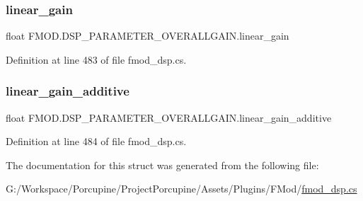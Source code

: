 \subsubsection{\texorpdfstring{linear\+\_\+gain}{linear\_gain}}
{\footnotesize\ttfamily float F\+M\+O\+D.\+D\+S\+P\+\_\+\+P\+A\+R\+A\+M\+E\+T\+E\+R\+\_\+\+O\+V\+E\+R\+A\+L\+L\+G\+A\+I\+N.\+linear\+\_\+gain}



Definition at line 483 of file fmod\+\_\+dsp.\+cs.

\mbox{\label{struct_f_m_o_d_1_1_d_s_p___p_a_r_a_m_e_t_e_r___o_v_e_r_a_l_l_g_a_i_n_a49f0014438b4c4a9f33d063dd326782e}} 
\subsubsection{\texorpdfstring{linear\+\_\+gain\+\_\+additive}{linear\_gain\_additive}}
{\footnotesize\ttfamily float F\+M\+O\+D.\+D\+S\+P\+\_\+\+P\+A\+R\+A\+M\+E\+T\+E\+R\+\_\+\+O\+V\+E\+R\+A\+L\+L\+G\+A\+I\+N.\+linear\+\_\+gain\+\_\+additive}



Definition at line 484 of file fmod\+\_\+dsp.\+cs.



The documentation for this struct was generated from the following file\+:\begin{DoxyCompactItemize}
\item 
G\+:/\+Workspace/\+Porcupine/\+Project\+Porcupine/\+Assets/\+Plugins/\+F\+Mod/\hyperlink{fmod__dsp_8cs}{fmod\+\_\+dsp.\+cs}\end{DoxyCompactItemize}
